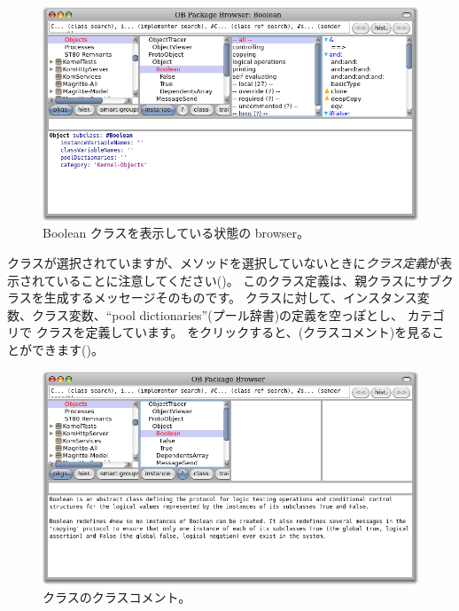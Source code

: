 \documentclass[a4paper,10pt,twoside]{book}
\begin{document}

\begin{figure}[hbt]
\centerline {\includegraphics[width=\textwidth]{Kernel-objects-boolean}}
\caption{Boolean クラスを表示している状態の browser。
}
\end{figure}

 クラスが選択されていますが、メソッドを選択していないときに\emph{クラス定義}が表示されていることに注意してください()。
このクラス定義は、親クラスにサブクラスを生成するメッセージそのものです。
 クラスに対して、インスタンス変数、クラス変数、``pool dictionaries''(プール辞書)の定義を空っぽとし、 カテゴリで  クラスを定義しています。
 をクリックすると、(クラスコメント)を見ることができます()。

\begin{figure}[hbt]
\centerline {\includegraphics[width=\textwidth]{classComment}}
\caption{ クラスのクラスコメント。
}
\end{figure}
\end{document}
